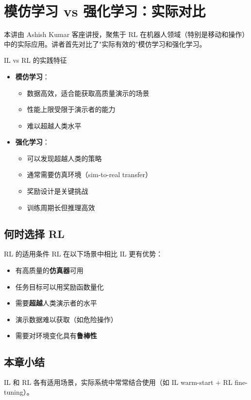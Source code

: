 \section{模仿学习 vs 强化学习：实际对比}

本讲由 Ashish Kumar 客座讲授，聚焦于 RL 在机器人领域（特别是移动和操作）中的实际应用。讲者首先对比了"实际有效的"模仿学习和强化学习。

\begin{importantbox}{IL vs RL 的实践特征}
\begin{itemize}
    \item \textbf{模仿学习}：
    \begin{itemize}
        \item 数据高效，适合能获取高质量演示的场景
        \item 性能上限受限于演示者的能力
        \item 难以超越人类水平
    \end{itemize}
    \item \textbf{强化学习}：
    \begin{itemize}
        \item 可以发现超越人类的策略
        \item 通常需要仿真环境（sim-to-real transfer）
        \item 奖励设计是关键挑战
        \item 训练周期长但推理高效
    \end{itemize}
\end{itemize}
\end{importantbox}

\subsection{何时选择 RL}

\begin{knowledgebox}{RL 的适用条件}
RL 在以下场景中相比 IL 更有优势：
\begin{itemize}
    \item 有高质量的\textbf{仿真器}可用
    \item 任务目标可以用奖励函数量化
    \item 需要\textbf{超越}人类演示者的水平
    \item 演示数据难以获取（如危险操作）
    \item 需要对环境变化具有\textbf{鲁棒性}
\end{itemize}
\end{knowledgebox}

\subsection{本章小结}

IL 和 RL 各有适用场景，实际系统中常常结合使用（如 IL warm-start + RL fine-tuning）。

